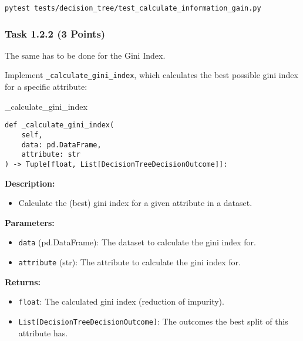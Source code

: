 \documentclass[
english,
smallborders
]{i6prcsht}
\newcommand{\points}[1]{\hfill \color{red}(#1 Points)\color{black}}
\begin{document}
\begin{lstlisting}
pytest tests/decision_tree/test_calculate_information_gain.py
\end{lstlisting}

\newpage

\subsubsection*{Task 1.2.2 \points{3}}

The same has to be done for the Gini Index.

Implement \texttt{\_calculate\_gini\_index}, which calculates the best possible gini index for a specific attribute:

\vspace*{0.3cm}

\begin{functionbox}{\_calculate\_gini\_index}
	\begin{lstlisting}[numbers=none]
def _calculate_gini_index(
    self, 
    data: pd.DataFrame, 
    attribute: str
) -> Tuple[float, List[DecisionTreeDecisionOutcome]]:
\end{lstlisting}
	
	\textbf{Description:}
	\begin{itemize}[leftmargin=*,topsep=0pt]
		\item Calculate the (best) gini index for a given attribute in a dataset.
	\end{itemize}
	
	\textbf{Parameters:}
	\begin{itemize}[leftmargin=*,topsep=0pt]
		\item \texttt{data} (pd.DataFrame): The dataset to calculate the gini index for.
		\item \texttt{attribute} (str): The attribute to calculate the gini index for.
	\end{itemize}
	
	\textbf{Returns:}
	\begin{itemize}[leftmargin=*,topsep=0pt]
		\item \texttt{float}: The calculated gini index (reduction of impurity).
		\item \texttt{List[DecisionTreeDecisionOutcome]}: The outcomes the best split of this attribute has.
	\end{itemize}
\end{functionbox}

\vspace*{0.5cm}
\end{document}
